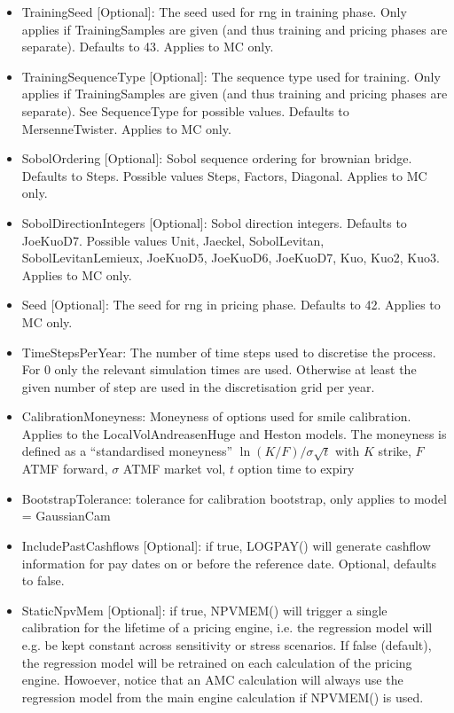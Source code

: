 \begin{itemize}
  pricing phase. Applies to MC only.
\item TrainingSeed [Optional]: The seed used for rng in training phase. Only applies if TrainingSamples are given (and
  thus training and pricing phases are separate). Defaults to 43. Applies to MC only.
\item TrainingSequenceType [Optional]: The sequence type used for training. Only applies if TrainingSamples are given
  (and thus training and pricing phases are separate). See SequenceType for possible values. Defaults to
  MersenneTwister. Applies to MC only.
\item SobolOrdering [Optional]: Sobol sequence ordering for brownian bridge. Defaults to Steps. Possible values Steps,
  Factors, Diagonal. Applies to MC only.
\item SobolDirectionIntegers [Optional]: Sobol direction integers. Defaults to JoeKuoD7. Possible values Unit, Jaeckel,
  SobolLevitan, SobolLevitanLemieux, JoeKuoD5, JoeKuoD6, JoeKuoD7, Kuo, Kuo2, Kuo3. Applies to MC only.
\item Seed [Optional]: The seed for rng in pricing phase. Defaults to 42. Applies to MC only.
\item TimeStepsPerYear: The number of time steps used to discretise the process. For 0 only the relevant simulation
  times are used. Otherwise at least the given number of step are used in the discretisation grid per year.
\item CalibrationMoneyness: Moneyness of options used for smile calibration. Applies to the LocalVolAndreasenHuge and
  Heston models. The moneyness is defined as a ``standardised moneyness'' $\ln(K/F) / \sigma\sqrt{t}$ with $K$ strike, $F$ ATMF
  forward, $\sigma$ ATMF market vol, $t$ option time to expiry
\item BootstrapTolerance: tolerance for calibration bootstrap, only applies to model = GaussianCam
\item IncludePastCashflows [Optional]: if true, LOGPAY() will generate cashflow information for pay dates on or before
  the reference date. Optional, defaults to false.
\item StaticNpvMem [Optional]: if true, NPVMEM() will trigger a single calibration for the lifetime of a pricing engine,
  i.e. the regression model will e.g. be kept constant across sensitivity or stress scenarios. If false (default), the
  regression model will be retrained on each calculation of the pricing engine. Howoever, notice that an AMC calculation
  will always use the regression model from the main engine calculation if NPVMEM() is used.

\end{itemize}
